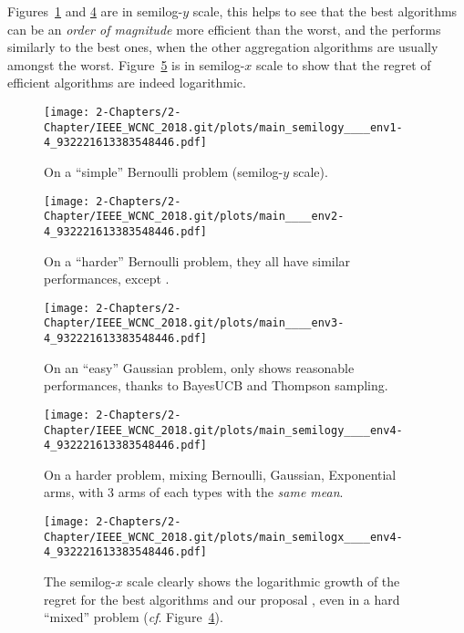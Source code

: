 Figures~\ref{fig:25:EasyBernoulli} and \ref{fig:25:HarderMixed} are in semilog-$y$ scale, this helps to see that the best algorithms can be an \emph{order of magnitude} more efficient than the worst, and the \Aggr{} performs similarly to the best ones, when the other aggregation algorithms are usually amongst the worst.
Figure~\ref{fig:25:HarderMixed_semilogx} is in semilog-$x$ scale to show that the regret of efficient algorithms are indeed logarithmic.


\begin{figure}[h!]  %
	\centering
	\texttt{[image: 2-Chapters/2-Chapter/IEEE\_WCNC\_2018.git/plots/main\_semilogy\_\_\_\_env1-4\_932221613383548446.pdf]}
	\caption{On a ``simple'' Bernoulli problem (semilog-$y$ scale).}
	\label{fig:25:EasyBernoulli}
\end{figure}

\begin{figure}[b!]  %
	\centering
	\texttt{[image: 2-Chapters/2-Chapter/IEEE\_WCNC\_2018.git/plots/main\_\_\_\_env2-4\_932221613383548446.pdf]}
	\caption{On a ``harder'' Bernoulli problem, they all have similar performances, except \LearnExp.}
	\label{fig:25:HardBernoulli}
\end{figure}

\begin{figure}[b!]  %
	\centering
	\texttt{[image: 2-Chapters/2-Chapter/IEEE\_WCNC\_2018.git/plots/main\_\_\_\_env3-4\_932221613383548446.pdf]}
	\caption{On an ``easy'' Gaussian problem, only \Aggr{} shows reasonable performances, thanks to BayesUCB and Thompson sampling.}
	\label{fig:25:EasyGaussian}
\end{figure}

\begin{figure}[h!]  %
	\centering
	\texttt{[image: 2-Chapters/2-Chapter/IEEE\_WCNC\_2018.git/plots/main\_semilogy\_\_\_\_env4-4\_932221613383548446.pdf]}
	\caption{On a harder problem, mixing Bernoulli, Gaussian, Exponential arms, with 3 arms of each types with the \emph{same mean}.}
	\label{fig:25:HarderMixed}
\end{figure}

\begin{figure}[b!]  %
	\centering
	\texttt{[image: 2-Chapters/2-Chapter/IEEE\_WCNC\_2018.git/plots/main\_semilogx\_\_\_\_env4-4\_932221613383548446.pdf]}
	\caption{The semilog-$x$ scale clearly shows the logarithmic growth of the regret for the best algorithms and our proposal \Aggr, even in a hard ``mixed'' problem (\emph{cf}. Figure~\ref{fig:25:HarderMixed}).}
	\label{fig:25:HarderMixed_semilogx}
\end{figure}

